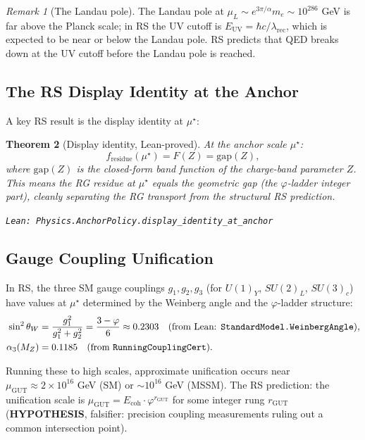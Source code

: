 \documentclass[12pt,a4paper]{article}
\newtheorem{theorem}{Theorem}[section]
\theoremstyle{definition}
\theoremstyle{remark}
\newtheorem{remark}[theorem]{Remark}
\begin{document}
\begin{remark}[The Landau pole]
The Landau pole at $\mu_L \sim e^{3\pi/\alpha} m_e \sim 10^{286}$ GeV
is far above the Planck scale; in RS the UV cutoff is
$E_\mathrm{UV} = \hbar c/\lambda_\mathrm{rec}$, which is expected to
be near or below the Landau pole.  RS predicts that QED breaks down
at the UV cutoff before the Landau pole is reached.
\end{remark}

\subsection{The RS Display Identity at the Anchor}

A key RS result is the display identity at $\mu^\star$:

\begin{theorem}[Display identity, Lean-proved]\label{thm:display}
At the anchor scale $\mu^\star$:
\begin{equation}
  f_\mathrm{residue}(\mu^\star) = F(Z) = \mathrm{gap}(Z),
\end{equation}
where $\mathrm{gap}(Z)$ is the closed-form band function of the
charge-band parameter $Z$.  This means the RG residue at $\mu^\star$
equals the geometric gap (the $\varphi$-ladder integer part), cleanly
separating the RG transport from the structural RS prediction.

\texttt{Lean: Physics.AnchorPolicy.display\_identity\_at\_anchor}
\end{theorem}

\subsection{Gauge Coupling Unification}

In RS, the three SM gauge couplings $g_1, g_2, g_3$ (for
$U(1)_Y$, $SU(2)_L$, $SU(3)_c$) have values at $\mu^\star$ determined
by the Weinberg angle and the $\varphi$-ladder structure:
\begin{align}
  \sin^2\theta_W &= \frac{g_1^2}{g_1^2 + g_2^2}
  = \frac{3-\varphi}{6} \approx 0.2303
  \quad (\text{from Lean: \texttt{StandardModel.WeinbergAngle}}), \\
  \alpha_3(M_Z) &= 0.1185
  \quad (\text{from \texttt{RunningCouplingCert}}).
\end{align}

Running these to high scales, approximate unification occurs near
$\mu_\mathrm{GUT} \approx 2 \times 10^{16}$ GeV (SM) or $\sim 10^{16}$
GeV (MSSM).  The RS prediction: the unification scale is
$\mu_\mathrm{GUT} = E_\mathrm{coh} \cdot \varphi^{r_\mathrm{GUT}}$
for some integer rung $r_\mathrm{GUT}$ (\textbf{HYPOTHESIS}, falsifier:
precision coupling measurements ruling out a common intersection point).
\end{document}
